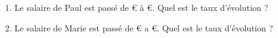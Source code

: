 
\begin{enumerate}
\item Le salaire de Paul est passé de  € à  €. Quel est le taux d'évolution ?
\item Le salaire de Marie est passé de  € a  €. Quel est le taux d'évolution ?
\end{enumerate}